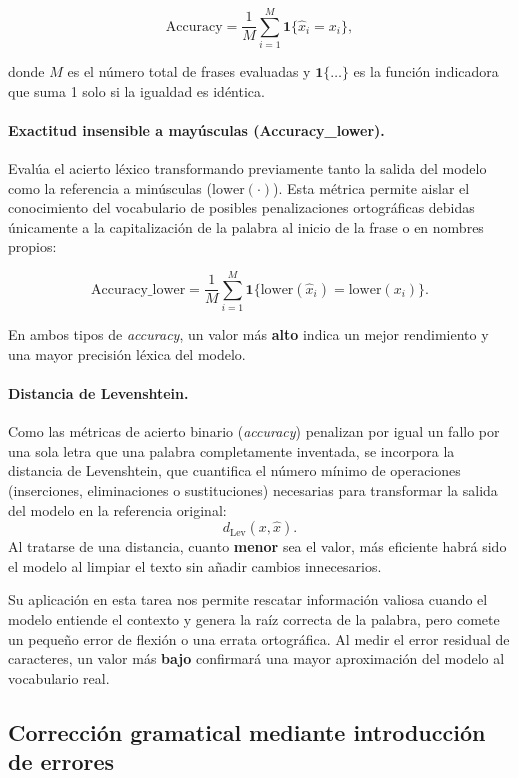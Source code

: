 \[
\text{Accuracy} = \frac{1}{M} \sum_{i=1}^M \mathbf{1}\{\hat{x}_i = x_i\},
\]

donde $M$ es el número total de frases evaluadas y $\mathbf{1}\{\dots\}$ es la función indicadora que suma 1 solo si la igualdad es idéntica.

\paragraph{Exactitud insensible a mayúsculas (Accuracy\_lower).} Evalúa el acierto léxico transformando previamente tanto la salida del modelo como la referencia a minúsculas ($\text{lower}(\cdot)$). Esta métrica permite aislar el conocimiento del vocabulario de posibles penalizaciones ortográficas debidas únicamente a la capitalización de la palabra al inicio de la frase o en nombres propios:

\[
\text{Accuracy\_lower} = \frac{1}{M} \sum_{i=1}^M \mathbf{1}\{\text{lower}(\hat{x}_i) = \text{lower}(x_i)\}.
\]

En ambos tipos de \emph{accuracy}, un valor más \textbf{alto} indica un mejor rendimiento y una mayor precisión léxica del modelo.

\paragraph{Distancia de Levenshtein.} Como las métricas de acierto binario (\emph{accuracy}) penalizan por igual un fallo por una sola letra que una palabra completamente inventada, se incorpora la distancia de Levenshtein,  que cuantifica el número mínimo de operaciones (inserciones, eliminaciones o sustituciones) necesarias para transformar la salida del modelo en la referencia original:
\[
d_{\text{Lev}}(x, \hat{x}).
\]
Al tratarse de una distancia, cuanto \textbf{menor} sea el valor, más eficiente habrá sido el modelo al limpiar el texto sin añadir cambios innecesarios. 

Su aplicación en esta tarea nos permite rescatar información valiosa cuando el modelo entiende el contexto y genera la raíz correcta de la palabra, pero comete un pequeño error de flexión o una errata ortográfica. Al medir el error residual de caracteres, un valor más \textbf{bajo} confirmará una mayor aproximación del modelo al vocabulario real.

\subsection{Corrección gramatical mediante introducción de errores}
\label{correccion-gramatical}

